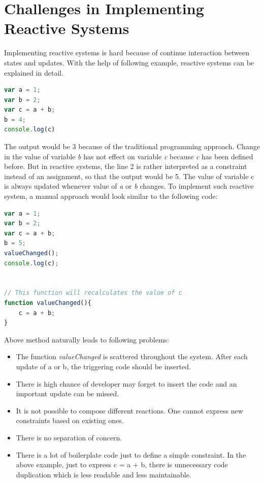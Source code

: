 \section {Challenges in Implementing Reactive Systems}
Implementing reactive systems is hard because of continue interaction between states and updates. With the help of following example, reactive systems can be explained in detail.

\begin{lstlisting}[language=JavaScript, caption=Sample example 1, label={lst:sample_example_1}]
var a = 1;
var b = 2;
var c = a + b;
b = 4;
console.log(c)
\end{lstlisting}
The output would be 3 because of the traditional programming approach. Change in the value of variable \textit{b} has not effect on variable \textit{c} because \textit{c} has been defined before. But in reactive systems, the line 2 is rather interpreted as a constraint instead of an assignment, so that the output would be 5. The value of variable c is always updated whenever value of \textit{a} or \textit{b} changes. 
To implement such reactive system, a manual approach would look similar to the following code:
\begin{lstlisting}[language=JavaScript, caption=Sample example 2, label={lst:sample_example_2}]
var a = 1;
var b = 2;
var c = a + b;
b = 5;
valueChanged();
console.log(c);


// This function will recalculates the value of c
function valueChanged(){
	c = a + b;
}
\end{lstlisting}
Above method naturally leads to following problems:

\begin{itemize}
	
	\item The function \textit{valueChanged} is scattered throughout the system. After each update of a or b, the triggering code should be inserted.
	\item There is high chance of developer may forget to insert the code and an important update can be missed.
	\item It is not possible to compose different reactions. One cannot express new constraints based on existing ones.
	\item There is no separation of concern.
	\item There is a lot of boilerplate code just to define a simple constraint. In the above example, just to express c = a + b, there is unnecessary code duplication which is less readable and less maintainable.
\end{itemize}
	
